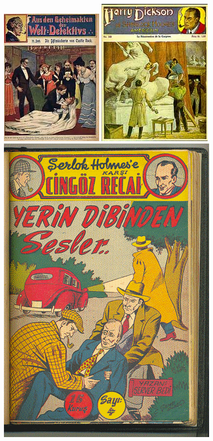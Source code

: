 \documentclass[a4paper,landscape,headrule,footrule,xetex]{foils}
\begin{document}


\includegraphics[height=0.7\textheight]{pics/weldetektives.jpeg}
\includegraphics[height=0.7\textheight]{pics/harrydickson1.jpg}
\includegraphics[height=0.7\textheight]{pics/yerindibindensesler.jpg}
\end{document}
